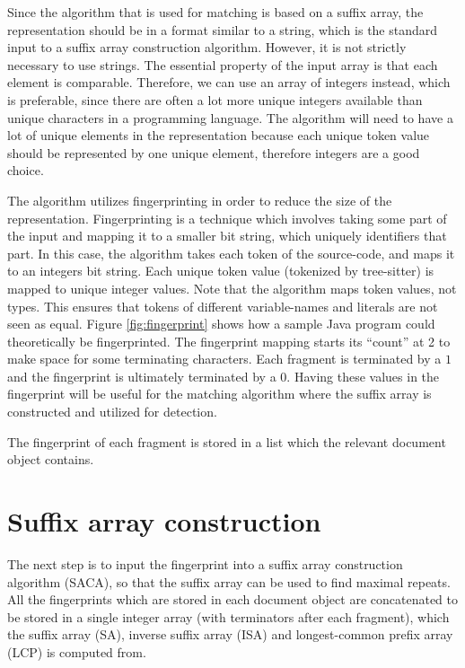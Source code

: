 Since the algorithm that is used for matching is based on a suffix array, the
representation should be in a format similar to a string, which is the standard input to a
suffix array construction algorithm. However, it is not strictly necessary to use strings.
The essential property of the input array is that each element is comparable. Therefore,
we can use an array of integers instead, which is preferable, since there are often a lot
more unique integers available than unique characters in a programming language. The
algorithm will need to have a lot of unique elements in the representation because each
unique token value should be represented by one unique element, therefore integers are a
good choice.


The algorithm utilizes fingerprinting in order to reduce the size of the representation.
Fingerprinting is a technique which involves taking some part of the input and mapping it
to a smaller bit string, which uniquely identifiers that part. In this case, the algorithm
takes each token of the source-code, and maps it to an integers bit string. Each unique
token value (tokenized by tree-sitter) is mapped to unique integer values. Note that the
algorithm maps token values, not types. This ensures that tokens of different
variable-names and literals are not seen as equal. Figure \ref{fig:fingerprint} shows how
a sample Java program could theoretically be fingerprinted. The fingerprint mapping starts
its ``count'' at 2 to make space for some terminating characters. Each fragment is
terminated by a $1$ and the fingerprint is ultimately terminated by a $0$. Having these
values in the fingerprint will be useful for the matching algorithm where the suffix array
is constructed and utilized for detection.

The fingerprint of each fragment is stored in a list which the relevant document object
contains.

\section{Suffix array construction}

The next step is to input the fingerprint into a suffix array construction algorithm
(SACA), so that the suffix array can be used to find maximal repeats. All the fingerprints
which are stored in each document object are concatenated to be stored in a single integer
array (with terminators after each fragment), which the suffix array (SA), inverse suffix
array (ISA) and longest-common prefix array (LCP) is computed from.

